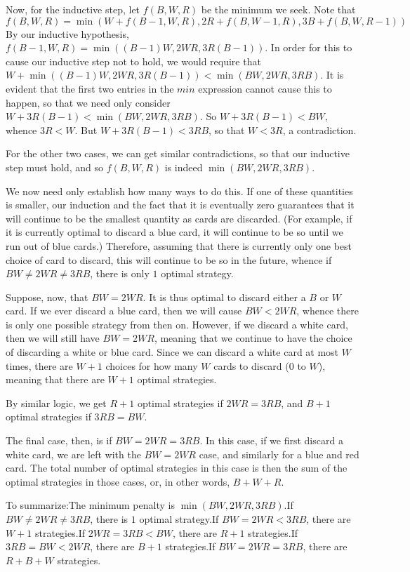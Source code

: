 \begin{enumerate}
 Now, for the inductive step, let $f(B,W,R)$ be the minimum we seek. Note that
 \[f(B,W,R) = \min(W+f(B-1,W,R),2R+f(B,W-1,R),3B+f(B,W,R-1))\]By our inductive hypothesis, $f(B-1,W,R) = \min((B-1)W,2WR,3R(B-1))$. In order for this to cause our inductive step not to hold, we would require that $W+\min((B-1)W,2WR,3R(B-1)) < \min(BW,2WR,3RB)$. It is evident that the first two entries in the $min$ expression cannot cause this to happen, so that we need only consider $W+3R(B-1) < \min(BW,2WR,3RB)$. So $W+3R(B-1) < BW$, whence $3R < W$. But $W+3R(B-1) < 3RB$, so that $W < 3R$, a contradiction.

 For the other two cases, we can get similar contradictions, so that our inductive step must hold, and so $f(B,W,R)$ is indeed $\min(BW,2WR,3RB)$.

 We now need only establish how many ways to do this. If one of these quantities is smaller, our induction and the fact that it is eventually zero guarantees that it will continue to be the smallest quantity as cards are discarded. (For example, if it is currently optimal to discard a blue card, it will continue to be so until we run out of blue cards.) Therefore, assuming that there is currently only one best choice of card to discard, this will continue to be so in the future, whence if $BW \neq 2WR \neq 3RB$, there is only $1$ optimal strategy.

 Suppose, now, that $BW = 2WR$. It is thus optimal to discard either a $B$ or $W$ card. If we ever discard a blue card, then we will cause $BW < 2WR$, whence there is only one possible strategy from then on. However, if we discard a white card, then we will still have $BW = 2WR$, meaning that we continue to have the choice of discarding a white or blue card. Since we can discard a white card at most $W$ times, there are $W+1$ choices for how many $W$ cards to discard ($0$ to $W$), meaning that there are $W+1$ optimal strategies.

 By similar logic, we get $R+1$ optimal strategies if $2WR = 3RB$, and $B+1$ optimal strategies if $3RB = BW$.

 The final case, then, is if $BW = 2WR = 3RB$. In this case, if we first discard a white card, we are left with the $BW = 2WR$ case, and similarly for a blue and red card. The total number of optimal strategies in this case is then the sum of the optimal strategies in those cases, or, in other words, $B+W+R$.

 To summarize:The minimum penalty is $\min(BW,2WR,3RB)$.If $BW \neq 2WR \neq 3RB$, there is $1$ optimal strategy.If $BW = 2WR < 3RB$, there are $W+1$ strategies.If $2WR = 3RB < BW$, there are $R+1$ strategies.If $3RB = BW < 2WR$, there are $B+1$ strategies.If $BW = 2WR = 3RB$, there are $R+B+W$ strategies.


\end{enumerate}
